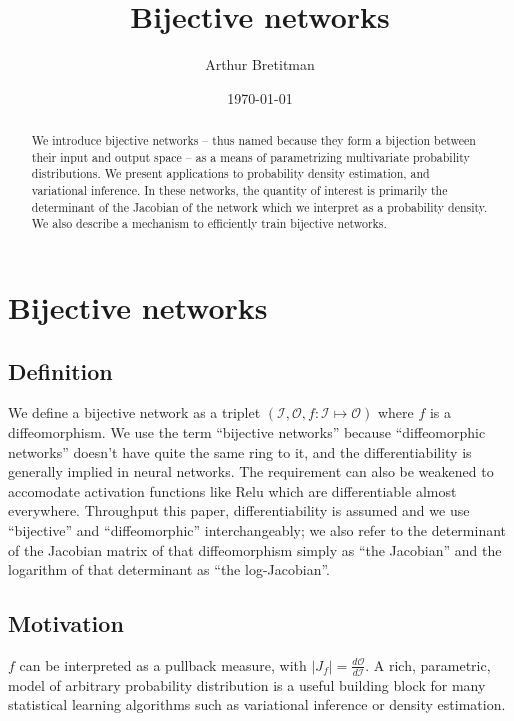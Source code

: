 \documentclass{article}
\title{Bijective networks}
\author{Arthur Bretitman}
\date{\today}
\begin{document}
\maketitle

\begin{abstract}
  We introduce bijective networks -- thus named because they form a bijection
  between their input and output space -- as a means of parametrizing
  multivariate probability distributions. We present applications to probability
  density estimation, and variational inference. In these networks, the quantity
  of interest is primarily the determinant of the Jacobian of the network which
  we interpret as a probability density. We also describe a mechanism to
  efficiently train bijective networks.
\end{abstract}

\section{Bijective networks}

\subsection{Definition}

We define a bijective network as a triplet
\((\mathcal{I}, \mathcal{O}, f  : \mathcal{I} \mapsto \mathcal{O})\)
where \(f\) is a diffeomorphism. We use the term ``bijective networks''
because ``diffeomorphic networks'' doesn't have quite the same ring to it,
and the differentiability is generally implied in neural networks. The
requirement can also be weakened to accomodate activation functions like
Relu which are differentiable almost everywhere. Throughput this paper,
differentiability is assumed and we use ``bijective'' and ``diffeomorphic''
interchangeably; we also refer to the determinant of the Jacobian matrix
of that diffeomorphism simply as ``the Jacobian'' and the logarithm of
that determinant as ``the log-Jacobian''.

\subsection{Motivation}

\(f\) can be interpreted as a pullback  measure, with
\(\left|J_f\right| = \frac{d \mathcal{O}}{d \mathcal{I}}\). A rich, parametric,
model of arbitrary probability distribution is a useful building block for many
statistical learning algorithms such as variational inference or density
estimation.
\end{document}
